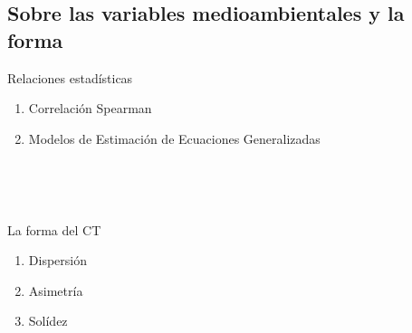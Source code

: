 \subsection{Sobre las variables medioambientales y la forma}

\begin{frame}
    \begin{alertblock}{Relaciones estadísticas}
        \begin{enumerate}
            \item Correlación Spearman
            \item Modelos de Estimación de Ecuaciones Generalizadas
        \end{enumerate}
        ~\
    \end{alertblock}
~\
    
    \begin{exampleblock}{La forma del CT}
        \begin{enumerate}
            \item Dispersión
            \item Asimetría
            \item Solídez
        \end{enumerate} 
        ~\
    \end{exampleblock}
\end{frame}
